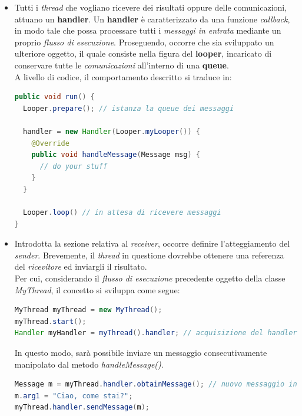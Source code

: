 \documentclass{article}
\begin{document}
\begin{itemize}[label={-}]
  \itemsep0em
  \item Tutti i \textit{thread} che vogliano ricevere dei risultati oppure delle comunicazioni, attuano un \textbf{handler}. Un \textbf{handler} è caratterizzato da una funzione \textit{callback}, in modo tale che possa processare tutti i \textit{messaggi in entrata} mediante un proprio \textit{flusso di esecuzione}. Proseguendo, occorre che sia sviluppato un ulteriore oggetto, il quale consiste nella figura del \textbf{looper}, incaricato di conservare tutte le \textit{comunicazioni} all'interno di una \textbf{queue}.\vspace*{7pt}\\
  A livello di codice, il comportamento descritto si traduce in:
  \begin{lstlisting}[language=JAVA]
public void run() {
  Looper.prepare(); // istanza la queue dei messaggi

  handler = new Handler(Looper.myLooper()) {
    @Override
    public void handleMessage(Message msg) {
      // do your stuff
    }
  }

  Looper.loop() // in attesa di ricevere messaggi
}
  \end{lstlisting}
  \item Introdotta la sezione relativa al \textit{receiver}, occorre definire l'atteggiamento del \textit{sender}. Brevemente, il \textit{thread} in questione dovrebbe ottenere una referenza del \textit{ricevitore} ed inviargli il risultato.\vspace*{7pt}\\ Per cui, considerando il \textit{flusso di esecuzione} precedente oggetto della classe \textit{MyThread}, il concetto si sviluppa come segue:
  \begin{lstlisting}[language=JAVA]
MyThread myThread = new MyThread();
myThread.start();
Handler myHandler = myThread().handler; // acquisizione del handler
  \end{lstlisting}
  In questo modo, sarà possibile inviare un messaggio consecutivamente manipolato dal metodo \textit{handleMessage()}.
  \begin{lstlisting}[language=JAVA]
Message m = myThread.handler.obtainMessage(); // nuovo messaggio inviato al mHandler del thread in attesa
m.arg1 = "Ciao, come stai?";
myThread.handler.sendMessage(m);
  \end{lstlisting}
\end{itemize}
\end{document}
